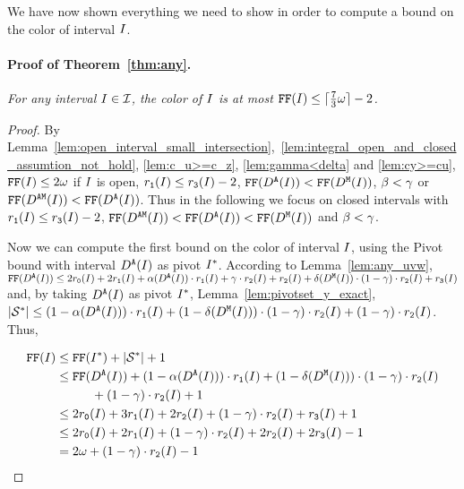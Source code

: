 {%
We have now shown everything we need to show in order to compute a bound on the color of interval $I$.

\paragraph*{Proof of Theorem~\ref{thm:any}.}
\emph{For any interval $I \in \mathcal{I}$, the color of $I$ is at most $\text{\texttt{FF}}(I) \leq \lceil \frac{7}{3}\omega \rceil - 2$.}

\begin{proof}
    By Lemma~\ref{lem:open_interval_small_intersection},~\ref{lem:integral_open_and_closed_assumtion_not_hold}, \ref{lem:c_u>=c_z}, \ref{lem:gamma<delta} and \ref{lem:cy>=cu}, $\text{\texttt{FF}}(I) \leq 2\omega$ if $I$ is open, $r_\texttt{1}(I) \leq r_\texttt{3}(I) - 2$, $\text{\texttt{FF}}(D^\texttt{A}(I)) < \text{\texttt{FF}}(D^\texttt{M}(I))$, $\beta  < \gamma $ or $\text{\texttt{FF}}(D^\texttt{AM}(I)) < \text{\texttt{FF}}(D^\texttt{A}(I))$.
    Thus in the following we focus on closed intervals with $r_\texttt{1}(I) \leq r_\texttt{3}(I) - 2$, $\text{\texttt{FF}}(D^\texttt{AM}(I)) < \text{\texttt{FF}}(D^\texttt{A}(I)) < \text{\texttt{FF}}(D^\texttt{M}(I))$ and $\beta  < \gamma $.

    Now we can compute the first bound on the color of interval $I$, using the Pivot bound with interval $D^\texttt{A}(I)$ as pivot $I^*$.
    According to Lemma~\ref{lem:any_uvw}, $\text{\texttt{FF}}(D^\texttt{A}(I)) \leq  2r_\texttt{0}(I) + 2r_\texttt{1}(I) + \alpha(D^\texttt{A}(I)) \cdot r_\texttt{1}(I) + \gamma  \cdot r_\texttt{2}(I) + r_\texttt{2}(I) + \delta(D^\texttt{M}(I)) \cdot (1 - \gamma ) \cdot r_\texttt{2}(I) + r_\texttt{3}(I)$ and, by taking $D^\texttt{A}(I)$ as pivot $I^*$,  Lemma~\ref{lem:pivotset_y_exact}, $|\mathcal{S}^*| \leq (1 - \alpha(D^\texttt{A}(I))) \cdot r_\texttt{1}(I) + (1 - \delta(D^\texttt{M}(I))) \cdot (1 - \gamma ) \cdot r_\texttt{2}(I) + (1 - \gamma ) \cdot r_\texttt{2}(I)$.
    Thus,

    \begin{align*}
        \text{\texttt{FF}}(I) &\leq \text{\texttt{FF}}(I^*) + |\mathcal{S}^*| + 1\\
        &\leq \text{\texttt{FF}}(D^\texttt{A}(I)) + (1 - \alpha(D^\texttt{A}(I))) \cdot r_\texttt{1}(I) + (1 - \delta(D^\texttt{M}(I))) \cdot (1 - \gamma ) \cdot r_\texttt{2}(I) \\ &\hspace{1cm} + (1 - \gamma ) \cdot r_\texttt{2}(I) + 1 \\
        &\leq 2r_\texttt{0}(I) + 3r_\texttt{1}(I) + 2r_\texttt{2}(I) + (1 - \gamma ) \cdot r_\texttt{2}(I) + r_\texttt{3}(I) + 1 \\
        &\leq 2r_\texttt{0}(I) + 2r_\texttt{1}(I) + (1 - \gamma ) \cdot r_\texttt{2}(I) + 2r_\texttt{2}(I) + 2r_\texttt{3}(I) - 1\\
        &= 2\omega + (1 - \gamma ) \cdot r_\texttt{2}(I) - 1
    \end{align*}


\end{proof}}
